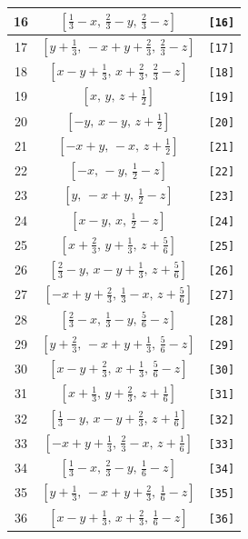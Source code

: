 \documentclass[fleqn,8pt]{jsarticle}
\begin{document}
\begin{longtable}{ccc}
16 & $\left[ \frac{1}{3} - x,\, \frac{2}{3} - y,\, \frac{2}{3} - z \right]$ & {\tt [16]} \\ \hline
17 & $\left[ y + \frac{1}{3},\, - x + y + \frac{2}{3},\, \frac{2}{3} - z \right]$ & {\tt [17]} \\ \hline
18 & $\left[ x - y + \frac{1}{3},\, x + \frac{2}{3},\, \frac{2}{3} - z \right]$ & {\tt [18]} \\ \hline
19 & $\left[ x,\, y,\, z + \frac{1}{2} \right]$ & {\tt [19]} \\ \hline
20 & $\left[ - y,\, x - y,\, z + \frac{1}{2} \right]$ & {\tt [20]} \\ \hline
21 & $\left[ - x + y,\, - x,\, z + \frac{1}{2} \right]$ & {\tt [21]} \\ \hline
22 & $\left[ - x,\, - y,\, \frac{1}{2} - z \right]$ & {\tt [22]} \\ \hline
23 & $\left[ y,\, - x + y,\, \frac{1}{2} - z \right]$ & {\tt [23]} \\ \hline
24 & $\left[ x - y,\, x,\, \frac{1}{2} - z \right]$ & {\tt [24]} \\ \hline
25 & $\left[ x + \frac{2}{3},\, y + \frac{1}{3},\, z + \frac{5}{6} \right]$ & {\tt [25]} \\ \hline
26 & $\left[ \frac{2}{3} - y,\, x - y + \frac{1}{3},\, z + \frac{5}{6} \right]$ & {\tt [26]} \\ \hline
27 & $\left[ - x + y + \frac{2}{3},\, \frac{1}{3} - x,\, z + \frac{5}{6} \right]$ & {\tt [27]} \\ \hline
28 & $\left[ \frac{2}{3} - x,\, \frac{1}{3} - y,\, \frac{5}{6} - z \right]$ & {\tt [28]} \\ \hline
29 & $\left[ y + \frac{2}{3},\, - x + y + \frac{1}{3},\, \frac{5}{6} - z \right]$ & {\tt [29]} \\ \hline
30 & $\left[ x - y + \frac{2}{3},\, x + \frac{1}{3},\, \frac{5}{6} - z \right]$ & {\tt [30]} \\ \hline
31 & $\left[ x + \frac{1}{3},\, y + \frac{2}{3},\, z + \frac{1}{6} \right]$ & {\tt [31]} \\ \hline
32 & $\left[ \frac{1}{3} - y,\, x - y + \frac{2}{3},\, z + \frac{1}{6} \right]$ & {\tt [32]} \\ \hline
33 & $\left[ - x + y + \frac{1}{3},\, \frac{2}{3} - x,\, z + \frac{1}{6} \right]$ & {\tt [33]} \\ \hline
34 & $\left[ \frac{1}{3} - x,\, \frac{2}{3} - y,\, \frac{1}{6} - z \right]$ & {\tt [34]} \\ \hline
35 & $\left[ y + \frac{1}{3},\, - x + y + \frac{2}{3},\, \frac{1}{6} - z \right]$ & {\tt [35]} \\ \hline
36 & $\left[ x - y + \frac{1}{3},\, x + \frac{2}{3},\, \frac{1}{6} - z \right]$ & {\tt [36]} \\
\end{longtable}
\end{document}
